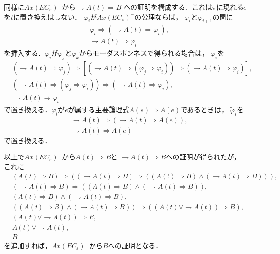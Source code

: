 	同様に$Ax(EC_{\varepsilon})^{-}$から$\rightharpoondown A(t) \Longrightarrow B$
	への証明を構成する．これは$\pi$に現れる$e$を$t$に置き換えはしない．
	$\varphi_{i}$が$Ax(EC_{\varepsilon})^{-}$の公理ならば，
	$\varphi_{i}$と$\varphi_{i+1}$の間に
	\begin{align}
		&\varphi_{i} \Longrightarrow (\rightharpoondown A(t) \Longrightarrow \varphi_{i}), \\
		&\rightharpoondown A(t) \Longrightarrow \varphi_{i}
	\end{align}
	を挿入する．$\varphi_{i}$が$\varphi_{j}$と$\varphi_{k}$からモーダスポンネスで得られる場合は，
	$\varphi_{i}$を
	\begin{align}
		&(\rightharpoondown A(t) \Longrightarrow \varphi_{j}) \Longrightarrow
		[(\rightharpoondown A(t) \Longrightarrow 
		(\varphi_{j}\Longrightarrow \varphi_{i}))
		\Longrightarrow (\rightharpoondown A(t) \Longrightarrow \varphi_{i})], \\
		&(\rightharpoondown A(t) \Longrightarrow 
		(\varphi_{j} \Longrightarrow \varphi_{i}))
		\Longrightarrow (\rightharpoondown A(t) \Longrightarrow \varphi_{i}), \\
		&\rightharpoondown A(t) \Longrightarrow \varphi_{i}
	\end{align}
	で置き換える．$\varphi_{i}$が$e$が属する主要論理式$A(s) \Longrightarrow A(e)$であるときは，
	$\tilde{\varphi}_{i}$を
	\begin{align}
		&\rightharpoondown A(t) \Longrightarrow (\rightharpoondown A(t) \Longrightarrow A(e)), \\
		&\rightharpoondown A(t) \Longrightarrow A(e)
	\end{align}
	で置き換える．
	
	以上で$Ax(EC_{\varepsilon})^{-}$から$A(t) \Longrightarrow B$と
	$\rightharpoondown A(t) \Longrightarrow B$への証明が得られたが，
	これに
	\begin{align}
		&(A(t) \Longrightarrow B) \Longrightarrow
		((\rightharpoondown A(t) \Longrightarrow B) \Longrightarrow
		((A(t) \Longrightarrow B) \wedge (\rightharpoondown A(t) \Longrightarrow B))), \\
		&(\rightharpoondown A(t) \Longrightarrow B) \Longrightarrow
		((A(t) \Longrightarrow B) \wedge (\rightharpoondown A(t) \Longrightarrow B)), \\
		&(A(t) \Longrightarrow B) \wedge (\rightharpoondown A(t) \Longrightarrow B), \\
		&((A(t) \Longrightarrow B) \wedge (\rightharpoondown A(t) \Longrightarrow B))
		\Longrightarrow ((A(t) \vee \rightharpoondown A(t)) \Longrightarrow B), \\
		&(A(t) \vee \rightharpoondown A(t)) \Longrightarrow B, \\
		&A(t) \vee \rightharpoondown A(t), \\
		&B
	\end{align}
	を追加すれば，$Ax(EC_{\varepsilon})^{-}$から$B$への証明となる．
	
